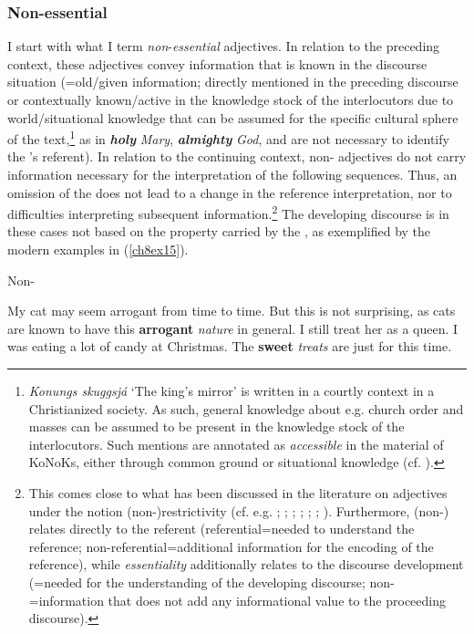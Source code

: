 \documentclass[output=paper,colorlinks,citecolor=brown]{langscibook}
\begin{document}
\subsubsection{Non-essential}\label{ch8s3.4.1}
I start with what I term \emph{non}-\emph{essential} adjectives. In
relation to the preceding context, these adjectives convey
information that is known in the discourse situation (=old/given
information; directly mentioned in the preceding discourse or
contextually known/active in the knowledge stock of the interlocutors
due to world/situational knowledge that can be assumed for the specific
cultural sphere of the text,\footnote{\textit{Konungs skuggsjá} `The king's mirror' is written in
  a courtly context in a Christianized society. As such,  general
  knowledge about e.g. church order and masses can be assumed to be
  present in the knowledge stock of the interlocutors. Such mentions
  are annotated as \emph{accessible} in the  material of KoNoKs,
  either through common ground or situational knowledge (cf. \citealp[94ff]{Tiemann2023}).} as in \textit{\textbf{holy}} \textit{Mary}, \textit{\textbf{almighty}} \textit{God}, and are not
necessary to identify the 's referent). In relation to the continuing
context, non- adjectives do not carry information necessary for the interpretation of the following sequences. Thus, an omission of the
 does not lead to a change in the reference interpretation,
nor to difficulties interpreting subsequent information.\footnote{This
  comes close to what has been discussed in the literature on adjectives
  under the notion (non-)restrictivity (cf. e.g. \citealp{Bolinger1967}; \citealp{LarsonMarušič2004}; \citealp{Truswell2005}; \citealp{Umbach2006}; \citealp{Demonte2008}; \citealp{Cinque2010}; \citealp{Pfaff2015}). Furthermore, (non-) relates directly to the
  referent (referential=needed to understand the reference;
  non-referential=additional information for the encoding of the
  reference), while \emph{essentiality} additionally relates to the
  discourse development (=needed for the understanding of the
  developing discourse; non-=information that does not add any
  informational value to the proceeding discourse).} The developing
discourse is in these cases not based on the property carried by the
, as exemplified by the modern examples in (\ref{ch8ex15}).

\begin{exe}
\ex\label{ch8ex15}Non-
\begin{xlist}
\ex\label{ch8ex15a} My cat may seem arrogant from time to time. But this is not surprising, as cats are known to have this \textbf{arrogant} \textit{nature} in general. I still treat her as a queen.
\ex\label{ch8ex15b} I was eating a lot of candy at Christmas. The \textbf{sweet} \textit{treats} are just for this time.
\end{xlist}
\end{exe}
\end{document}
